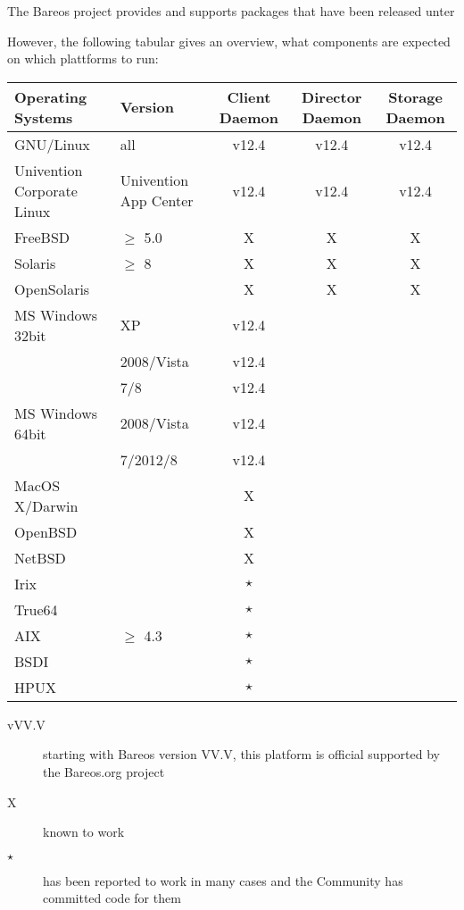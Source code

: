 
The Bareos project provides and supports packages that have been released unter

However, the following tabular gives an overview, what components are expected on which plattforms to run:

\begin{tabular}[h]{|l|l|c|c|c|}
  \hline
  Operating Systems & Version & Client \small{Daemon} & Director \small{Daemon} & Storage \small{Daemon} \\
  \hline
  \hline
  GNU/Linux  & all & v12.4 & v12.4 & v12.4 \\
  \hline
  Univention Corporate Linux & Univention App Center & v12.4 & v12.4 & v12.4 \\
  \hline
  FreeBSD & $\geq$ 5.0 & X & X & X
  \\
  \hline
  Solaris & $\geq$ 8 & X & X & X \\
  \hline
  OpenSolaris & ~ & X & X & X \\
  \hline
  \hline
  MS Windows 32bit & XP & v12.4  &  &  \\
  ~ & 2008/Vista & v12.4  &  &  \\
  ~ & 7/8 & v12.4 &  &  \\
  \hline
  MS Windows 64bit& 2008/Vista & v12.4 &  &  \\
  ~ & 7/2012/8 & v12.4 &  &  \\
  \hline
  \hline
  MacOS X/Darwin & ~ & X &  &  \\
  \hline
  OpenBSD & ~ & X &  & ~ \\
  \hline
  NetBSD & ~ & X &  & ~ \\
  \hline
  Irix & ~ & $\star$ & ~ & ~ \\
  \hline
  True64 & ~ & $\star$ & ~ & ~ \\
  \hline
  AIX & $\geq$ 4.3 & $\star$ & ~ & ~ \\
  \hline
  BSDI & ~ & $\star$ & ~ & ~ \\
  \hline
  HPUX & ~ & $\star$ & ~ & ~ \\
  \hline
\end{tabular}

\begin{description}
\item[vVV.V] starting with Bareos version VV.V, this platform is official supported by the Bareos.org project
\item[X] known to work
\item[$\star$] has been reported to work in many cases and the Community
   has committed code for them
\end{description}



